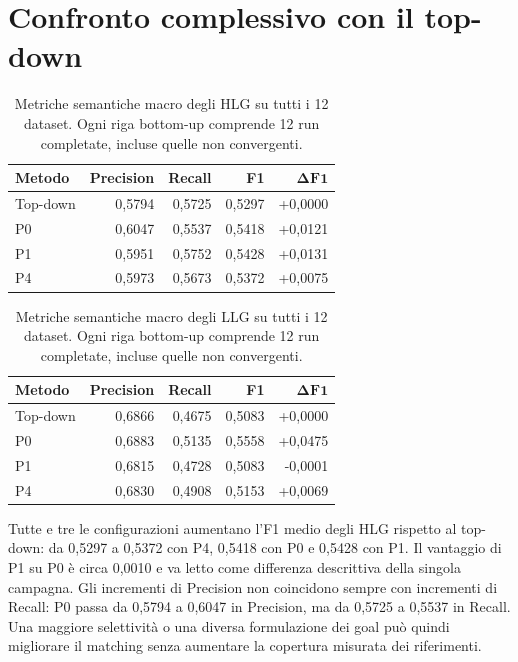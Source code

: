 \section{Confronto complessivo con il top-down}
\begin{table}[htbp]
\centering
\caption{Metriche semantiche macro degli HLG su tutti i 12 dataset. Ogni riga bottom-up comprende 12 run completate, incluse quelle non convergenti.}
\label{tab:results-HLG-macro}
\begin{tabular}{lrrrr}
\toprule
\textbf{Metodo} & \textbf{Precision} & \textbf{Recall} & \textbf{F1} & $\boldsymbol{\Delta F1}$ \\
\midrule
Top-down & 0,5794 & 0,5725 & 0,5297 & +0,0000 \\
P0 & 0,6047 & 0,5537 & 0,5418 & +0,0121 \\
P1 & 0,5951 & 0,5752 & 0,5428 & +0,0131 \\
P4 & 0,5973 & 0,5673 & 0,5372 & +0,0075 \\
\bottomrule
\end{tabular}
\end{table}

\begin{table}[htbp]
\centering
\caption{Metriche semantiche macro degli LLG su tutti i 12 dataset. Ogni riga bottom-up comprende 12 run completate, incluse quelle non convergenti.}
\label{tab:results-LLG-macro}
\begin{tabular}{lrrrr}
\toprule
\textbf{Metodo} & \textbf{Precision} & \textbf{Recall} & \textbf{F1} & $\boldsymbol{\Delta F1}$ \\
\midrule
Top-down & 0,6866 & 0,4675 & 0,5083 & +0,0000 \\
P0 & 0,6883 & 0,5135 & 0,5558 & +0,0475 \\
P1 & 0,6815 & 0,4728 & 0,5083 & -0,0001 \\
P4 & 0,6830 & 0,4908 & 0,5153 & +0,0069 \\
\bottomrule
\end{tabular}
\end{table}


Tutte e tre le configurazioni aumentano l'F1 medio degli HLG rispetto
al top-down: da 0,5297 a 0,5372 con P4, 0,5418 con P0 e 0,5428 con P1.
Il vantaggio di P1 su P0 \`e circa 0,0010 e va letto come differenza
descrittiva della singola campagna. Gli incrementi di Precision non
coincidono sempre con incrementi di Recall: P0 passa da 0,5794 a 0,6047
in Precision, ma da 0,5725 a 0,5537 in Recall. Una maggiore selettivit\`a
o una diversa formulazione dei goal pu\`o quindi migliorare il matching
senza aumentare la copertura misurata dei riferimenti.

